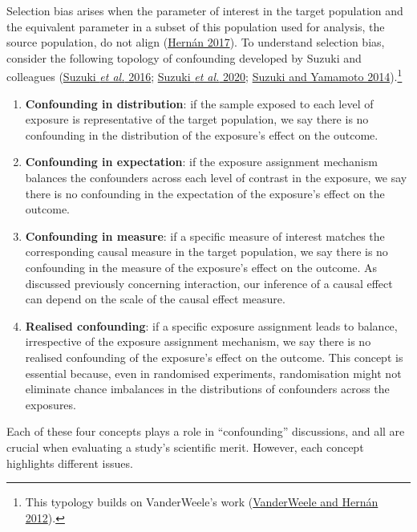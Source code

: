 \documentclass[
  singlecolumn]{article}
\begin{document}
Selection bias arises when the parameter of interest in the target
population and the equivalent parameter in a subset of this population
used for analysis, the source population, do not align
(\protect\hyperlink{ref-hernuxe1n2017}{Hernán 2017}). To understand
selection bias, consider the following topology of confounding developed
by Suzuki and colleagues (\protect\hyperlink{ref-suzuki2016}{Suzuki
\emph{et al.} 2016}; \protect\hyperlink{ref-suzuki2020}{Suzuki \emph{et
al.} 2020}; \protect\hyperlink{ref-suzuki2014}{Suzuki and Yamamoto
2014}).\footnote{This typology builds on VanderWeele's work
  (\protect\hyperlink{ref-vanderweele2012}{VanderWeele and Hernán
  2012}).}

\begin{enumerate}
\def\labelenumi{\arabic{enumi}.}
\item
  \textbf{Confounding in distribution}: if the sample exposed to each
  level of exposure is representative of the target population, we say
  there is no confounding in the distribution of the exposure's effect
  on the outcome.
\item
  \textbf{Confounding in expectation}: if the exposure assignment
  mechanism balances the confounders across each level of contrast in
  the exposure, we say there is no confounding in the expectation of the
  exposure's effect on the outcome.
\item
  \textbf{Confounding in measure}: if a specific measure of interest
  matches the corresponding causal measure in the target population, we
  say there is no confounding in the measure of the exposure's effect on
  the outcome. As discussed previously concerning interaction, our
  inference of a causal effect can depend on the scale of the causal
  effect measure.
\item
  \textbf{Realised confounding}: if a specific exposure assignment leads
  to balance, irrespective of the exposure assignment mechanism, we say
  there is no realised confounding of the exposure's effect on the
  outcome. This concept is essential because, even in randomised
  experiments, randomisation might not eliminate chance imbalances in
  the distributions of confounders across the exposures.
\end{enumerate}

Each of these four concepts plays a role in ``confounding'' discussions,
and all are crucial when evaluating a study's scientific merit. However,
each concept highlights different issues.
\end{document}
